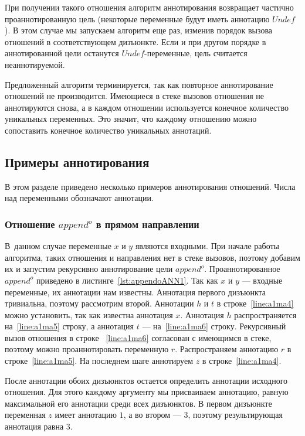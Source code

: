 \documentclass[conference,a4paper,american,russian]{IEEEtran}
\begin{document}
При получении такого отношения алгоритм аннотирования возвращает частично проаннотированную цель (некоторые переменные будут иметь аннотацию  $Undef$).
В этом случае мы запускаем алгоритм еще раз, изменив порядок вызова отношений в соответствующем дизъюнкте.
Если и при другом порядке в аннотированной цели останутся $Undef$-переменные, цель считается неаннотируемой.

Предложенный алгоритм терминируется, так как повторное аннотирование отношений не производится.
Имеющиеся в стеке вызовов отношения не аннотируются снова, а в каждом отношении используется конечное количество уникальных переменных. 
Это значит, что каждому отношению можно сопоставить конечное количество уникальных аннотаций.

\subsection{Примеры аннотирования}

В этом разделе приведено несколько примеров аннотирования отношений.
Числа над переменными обозначают аннотации.

\subsubsection{Отношение $append^o$ в прямом направлении}

В~данном случае  переменные $x$ и $y$ являются входными. 
При начале работы алгоритма, таких отношения и направления нет в стеке вызовов, поэтому добавим их и запустим рекурсивно аннотирование цели $append^o$. 
Проаннотированное $append^o$ приведено в листинге~\ref{lst:appendoANN1}.
Так как $x$ и $y$ --- входные переменные, их аннотации нам известны.
Аннотация первого дизъюнкта тривиальна, поэтому рассмотрим второй.
Аннотации $h$ и $t$ в строке~\ref{line:a1ma4} можно установить, так как известна аннотация $x$.
Аннотация $h$ распространяется на~\ref{line:a1ma5} строку, а аннотация $t$ --- на~\ref{line:a1ma6} строку.
Рекурсивный вызов отношения в строке ~\ref{line:a1ma6} согласован с имеющимся в стеке, поэтому можно проаннотировать переменную $r$.
Распространяем аннотацию $r$ в строке~\ref{line:a1ma5}.
На последнем шаге аннотируем $z$ в строке~\ref{line:a1ma4}.

После аннотации обоих дизъюнктов остается определить аннотации исходного отношения. 
Для этого каждому аргументу мы присваиваем аннотацию, равную максимальной его аннотации среди всех дизъюнктов.
В первом дизъюнкте переменная $z$ имеет аннотацию $1$, а во втором --- $3$, поэтому результирующая аннотация равна $3$.
\end{document}
